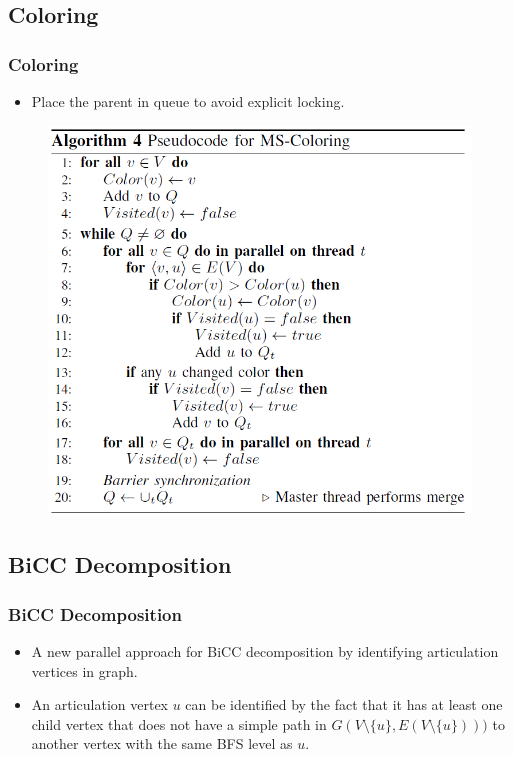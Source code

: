 \subsection{Coloring}
\begin{frame}
	\frametitle{Coloring}
	\begin{itemize}
		\item Place the parent in queue to avoid explicit locking.
	\end{itemize}
	\begin{figure}
		\includegraphics[scale=0.30]{figure/fig-MS-coloring.png}
	\end{figure}
\end{frame}

\subsection{BiCC Decomposition}
\begin{frame}
	\frametitle{BiCC Decomposition}
	\begin{itemize}
		\setlength\itemsep{1em}
		\item A new parallel approach for BiCC decomposition by identifying 
			articulation vertices in graph.
		\item An articulation vertex $u$ can be identified by the fact that it 
			has at least one child vertex that does not have a simple path in
			$G(V \setminus \{u\}, E(V \setminus \{u\})))$ to another vertex with 
			the same BFS level as $u$.
	\end{itemize}
\end{frame}


